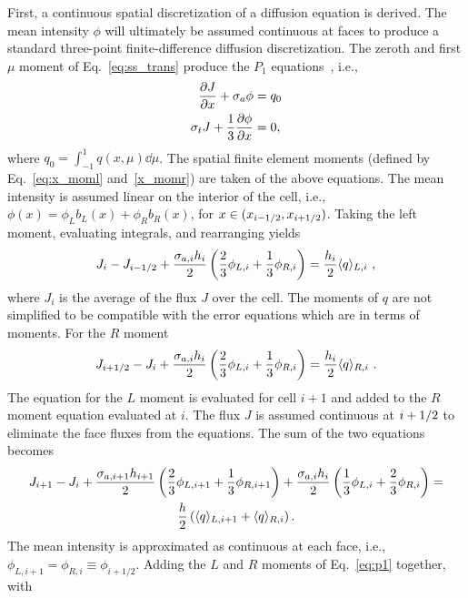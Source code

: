 First, a continuous spatial discretization of a diffusion equation is derived.  
The mean intensity $\phi$ will ultimately be assumed continuous at faces to produce a
standard three-point finite-difference diffusion discretization. 
The zeroth and first $\mu$ moment of Eq.~\eqref{eq:ss_trans} produce the $P_1$
equations~\cite{lewis,wla_thesis}, i.e., 
\begin{align}\label{eq:dsa_bal}
    \frac{\partial J}{\partial x} + \sigma_a \phi &= q_0 \\ \label{eq:p1}
    \sigma_t J + \frac{1}{3} \frac{\partial \phi}{\partial x} &= 0, 
\end{align}
where $q_0=\int_{-1}^1 q(x,\mu) \dd \mu $.
The spatial finite element moments (defined by Eq.~\eqref{eq:x_moml} and~\eqref{x_momr})
are taken of the above equations. 
The mean intensity is assumed linear on the interior of the cell, i.e.,
$\phi(x)=\phi_Lb_L(x) + \phi_Rb_R(x)$, for $x\in({x_{i-1/2}},{x_{i+1/2}})$.   Taking the left moment,
evaluating integrals, and rearranging yields
\begin{equation}
    J_{i} - J_{{i-1/2}}  + \frac{\sigma_{a,i}h_i}{2} \left(\frac{2}{3} \phi_{L,i} + \frac{1}{3}
    \phi_{R,i} \right) = \frac{h_i}{2} \langle q \rangle_{L,i}\,\,,
\end{equation}
where $J_i$ is the average of the flux $J$ over the cell. The moments of $q$ are
not simplified to be compatible with the error equations which are in terms of moments. For the $R$ moment
\begin{equation}
    J_{i+1/2} - J_{i}  + \frac{\sigma_{a,i}h_i}{2} \left(\frac{2}{3} \phi_{L,i} + \frac{1}{3}
    \phi_{R,i} \right) = \frac{h_i}{2} \langle q \rangle_{R,i}\,\,.
\end{equation}
The equation for the $L$ moment is evaluated for cell $i+1$ and added to the $R$ moment
equation evaluated at $i$.  The flux $J$ is assumed continuous at ${i+1/2}$ to eliminate
the face fluxes from the equations.  The sum of the two equations becomes
\begin{multline}\label{eq:diff_noclose}
    J_{i+1} - J_{i} + \frac{\sigma_{a,i+1} h_{i+1}}{2}\left(\frac{2}{3} \phi_{L,i+1} +
    \frac{1}{3}\phi_{R,i+1}\right) + \frac{\sigma_{a,i} h_i}{2} \left( \frac{1}{3} \phi_{L,i} +
    \frac{2}{3}\phi_{R,i}\right) =\\ \frac{h}{2} \left(\langle q \rangle_{L,i+1} + \langle q \rangle_{R,i}
    \right).
\end{multline}
The mean intensity is approximated as continuous at each face, i.e., $\phi_{L,i+1} = \phi_{R,i}
\equiv \phi_{i+1/2}$.  Adding the $L$ and $R$ moments of Eq.~\eqref{eq:p1} together, with
